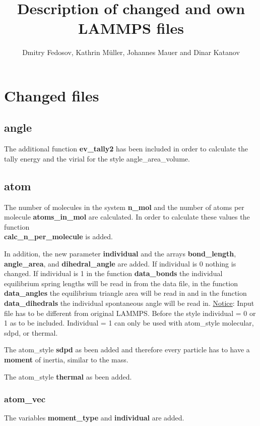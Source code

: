 \documentclass[a4paper,10pt]{scrreprt}
\title{Description of changed and own LAMMPS files}
\author{Dmitry Fedosov, Kathrin M\"uller, Johannes Mauer and Dinar Katanov}
\begin{document}
\maketitle
 \tableofcontents

\chapter{Changed files}


\section{angle}

The additional function \textbf{ev\_tally2} has been included in order to calculate the tally energy and the virial for the style angle\_area\_volume.

\section{atom}

The number of molecules in the system \textbf{n\_mol} and the number of atoms per molecule \textbf{atoms\_in\_mol} are calculated.
In order to calculate these values the function\\ \textbf{calc\_n\_per\_molecule} is added.

In addition, the new parameter \textbf{individual} and the arrays \textbf{bond\_length}, \textbf{angle\_area}, and \textbf{dihedral\_angle} are added.
If individual is 0 nothing is changed.
If individual is 1 in the function \textbf{data\_bonds} the individual equilibrium spring lengths will be read in from the data file, in the function \textbf{data\_angles} the equilibrium triangle area will be read in and in the function \textbf{data\_dihedrals} the individual spontaneous angle will be read in.
\underline{Notice}: Input file has to be different from original LAMMPS.
Before the style individual = 0 or 1 as to be included.
Individual = 1 can only be used with atom\_style molecular, sdpd, or thermal.

The atom\_style \textbf{sdpd} as been added and therefore every particle has to have a \textbf{moment} of inertia, similar to the mass.

The atom\_style \textbf{thermal} as been added.


\subsection{atom\_vec}
The variables \textbf{moment\_type} and \textbf{individual} are added.
\end{document}
